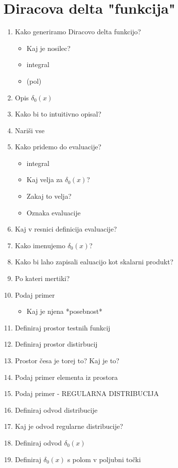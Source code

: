 \documentclass{article}
\begin{document}
    \section{Diracova delta "funkcija"}
    \begin{enumerate}
        \item Kako generiramo Diracovo delta funkcijo? 
        \begin{itemize}
            \item Kaj je nosilec?
            \item integral
            \item (pol)
        \end{itemize}
        \item Opis $\delta_0 (x)$
        \item Kako bi to intuitivno opisal? 
        \item Nariši vse
        \item Kako pridemo do evaluacije?
        \begin{itemize}
            \item integral
            \item Kaj velja za  $\delta_0 (x)$?
            \item Zakaj to velja?
            \item Oznaka evaluacije
        \end{itemize}
        \item Kaj v resnici definicija evaluacije?
        \item Kako imenujemo  $\delta_0 (x)$?
        \item Kako bi laho zapisali ealuacijo kot skalarni produkt?
        \item Po kateri mertiki?
        \item Podaj primer
        \begin{itemize}
            \item Kaj je njena *posebnost*
        \end{itemize}
        \item Definiraj prostor testnih funkcij
        \item Definiraj prostor distirbucij
        \item Prostor česa je torej to? Kaj je to?
        \item Podaj primer elementa iz prostora 
        \item Podaj primer - REGULARNA DISTRIBUCIJA
        \item Definiraj odvod distribucije 
        \item Kaj je odvod regularne distribucije? 
        \item Definiraj odvod  $\delta_0 (x)$
        \item Definiraj  $\delta_0 (x)$ s polom v poljubni točki
    \end{enumerate}
\end{document}
